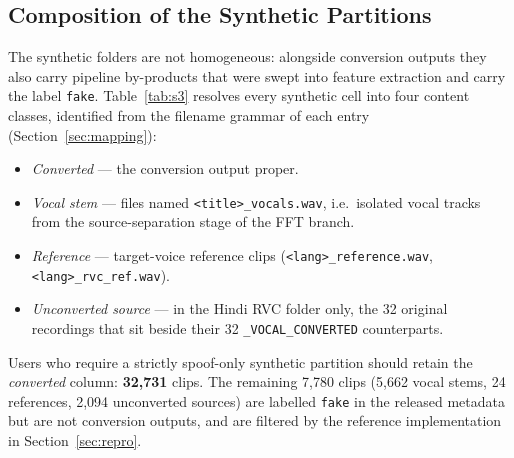 \documentclass[conference]{IEEEtran}
\begin{document}
\subsection{Composition of the Synthetic Partitions}
\label{sec:composition}
The synthetic folders are not homogeneous: alongside conversion outputs they also carry
pipeline by-products that were swept into feature extraction and carry the label
\texttt{fake}. Table~\ref{tab:s3} resolves every synthetic cell into four content classes,
identified from the filename grammar of each entry (Section~\ref{sec:mapping}):

\begin{itemize}
  \item \emph{Converted} --- the conversion output proper.
  \item \emph{Vocal stem} --- files named \texttt{<title>\_vocals.wav}, i.e.\ isolated
        vocal tracks from the source-separation stage of the FFT branch.
  \item \emph{Reference} --- target-voice reference clips
        (\texttt{<lang>\_reference.wav}, \texttt{<lang>\_rvc\_ref.wav}).
  \item \emph{Unconverted source} --- in the Hindi RVC folder only, the 32 original
        recordings that sit beside their 32 \texttt{\_VOCAL\_CONVERTED} counterparts.
\end{itemize}

Users who require a strictly spoof-only synthetic partition should retain the
\emph{converted} column: \textbf{32{,}731} clips. The remaining 7{,}780 clips
(5{,}662 vocal stems, 24 references, 2{,}094 unconverted sources) are labelled
\texttt{fake} in the released metadata but are not conversion outputs, and are filtered by
the reference implementation in Section~\ref{sec:repro}.
\end{document}
